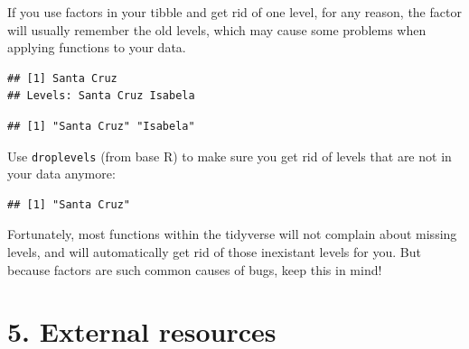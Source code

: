 \documentclass[]{book}
\newenvironment{Shaded}{}{}
\newcommand{\CommentTok}[1]{\textcolor[rgb]{0.38,0.63,0.69}{\textit{#1}}}
\newcommand{\KeywordTok}[1]{\textcolor[rgb]{0.00,0.44,0.13}{\textbf{#1}}}
\newcommand{\NormalTok}[1]{#1}
\newcommand{\OperatorTok}[1]{\textcolor[rgb]{0.40,0.40,0.40}{#1}}
\newcommand{\StringTok}[1]{\textcolor[rgb]{0.25,0.44,0.63}{#1}}
\begin{document}
If you use factors in your tibble and get rid of one level, for any reason, the factor will usually remember the old levels, which may cause some problems when applying functions to your data.

\begin{Shaded}
\end{Shaded}

\begin{verbatim}
## [1] Santa Cruz
## Levels: Santa Cruz Isabela
\end{verbatim}

\begin{Shaded}
\end{Shaded}

\begin{verbatim}
## [1] "Santa Cruz" "Isabela"
\end{verbatim}

Use \texttt{droplevels} (from base R) to make sure you get rid of levels that are not in your data anymore:

\begin{Shaded}
\end{Shaded}

\begin{verbatim}
## [1] "Santa Cruz"
\end{verbatim}

Fortunately, most functions within the tidyverse will not complain about missing levels, and will automatically get rid of those inexistant levels for you. But because factors are such common causes of bugs, keep this in mind!

\hypertarget{external-resources}{%
\section{5. External resources}\label{external-resources}}
\end{document}
